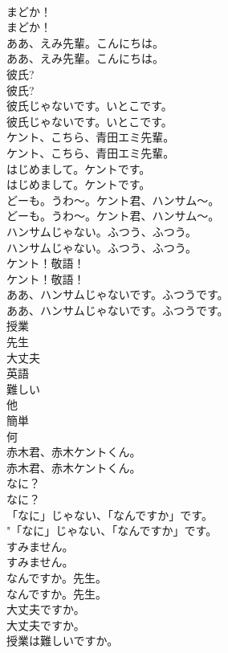 \documentclass[8pt]{extreport}
\begin{document}
\begin{CJK}{UTF8}{min}
\\	まどか！	
\\	まどか！ 
\\	ああ、えみ先輩。こんにちは。	
\\	ああ、えみ先輩。こんにちは。 
\\	彼氏?	
\\	彼氏? 
\\	彼氏じゃないです。いとこです。	
\\	彼氏じゃないです。いとこです。 
\\	ケント、こちら、青田エミ先輩。	
\\	ケント、こちら、青田エミ先輩。 
\\	はじめまして。ケントです。	
\\	はじめまして。ケントです。 
\\	どーも。うわ～。ケント君、ハンサム～。	
\\	どーも。うわ～。ケント君、ハンサム～。 
\\	ハンサムじゃない。ふつう、ふつう。	
\\	ハンサムじゃない。ふつう、ふつう。 
\\	ケント！敬語！	
\\	ケント！敬語！ 
\\	ああ、ハンサムじゃないです。ふつうです。	
\\	ああ、ハンサムじゃないです。ふつうです。 
\\	授業
\\	先生
\\	大丈夫
\\	英語
\\	難しい
\\	他
\\	簡単
\\	何
\\	赤木君、赤木ケントくん。	
\\	赤木君、赤木ケントくん。 
\\	なに？	
\\	なに？ 
\\	「なに」じゃない、「なんですか」です。	
\\	"「なに」じゃない、「なんですか」です。 
\\	すみません。	
\\	すみません。 
\\	なんですか。先生。	
\\	なんですか。先生。 
\\	大丈夫ですか。	
\\	大丈夫ですか。 
\\	授業は難しいですか。	

\end{CJK}
\end{document}
